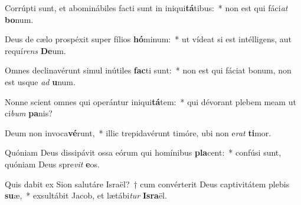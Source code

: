 \item Corrúpti sunt, et abominábiles facti sunt in iniqui\textbf{tá}tibus:~* non est qui fáci\textit{at} \textbf{bo}num.
\item Deus de cælo prospéxit super fílios \textbf{hó}minum:~* ut vídeat si est intélligens, aut requí\textit{rens} \textbf{De}um.
\item Omnes declinavérunt simul inútiles \textbf{fac}ti sunt:~* non est qui fáciat bonum, non est usque \textit{ad} \textbf{u}num.
\item Nonne scient omnes qui operántur iniqui\textbf{tá}tem:~* qui dévorant plebem meam ut ci\textit{bum} \textbf{pa}nis?
\item Deum non invoca\textbf{vé}runt,~* illic trepidavérunt timóre, ubi non e\textit{rat} \textbf{ti}mor.
\item Quóniam Deus dissipávit ossa eórum qui homínibus \textbf{pla}cent:~* confúsi sunt, quóniam Deus spre\textit{vit} \textbf{e}os.
\item Quis dabit ex Sion salutáre Israël?~† cum convérterit Deus captivitátem plebis \textbf{su}æ,~* exsultábit Jacob, et lætábi\textit{tur} \textbf{Is}\textbf{ra}ël.
